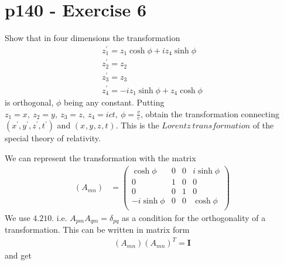 \section{p140 - Exercise 6}
\begin{tcolorbox}
Show that in four dimensions the transformation$$\begin{array}{l}
z^{'}_1 = z_1\cosh \phi + i z_4\sinh \phi\\
z^{'}_2 = z_2\\
z^{'}_3 = z_3\\
z^{'}_4 = -iz_1\sinh \phi +  z_4\cosh \phi
\end{array}$$
is orthogonal, $\phi$ being any constant. Putting $z_1=x,\ z_2 =y, \ z_3 = z, \ z_4 = ict, \ \phi = \frac{v}{c}$, obtain the transformation connecting $(x^{'},y^{'},z^{'},t^{'})$ and $(x^{},y^{},z^{},t^{})$. This is the $\mathit{Lorentz \ transformation} $ of the special theory of relativity.
\end{tcolorbox}
We can represent the transformation with the matrix
\begin{align}
\left(A_{mn}\right) &=
\begin{pmatrix}
 \cosh \phi&  0& 0 & i \sinh \phi \\
 0& 1 & 0 &0  \\
 0& 0 &  1&  0\\
 -i\sinh \phi&  0& 0 &  \cosh \phi \\
\end{pmatrix}
\end{align}
We use $\mathbf{4.210.}$ i.e. $A_{pm}A_{qm} = \delta _{pq}$ as a condition for the orthogonality of a transformation. This can be written in matrix form
\begin{align}
\left(A_{mn}\right)\left(A_{mn}\right)^{T}= \mathbf{I}
\end{align}
and get

